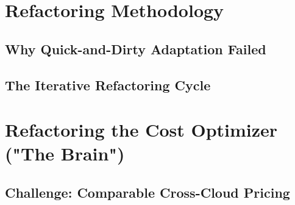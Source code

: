 
\section{Refactoring Methodology}

\subsection{Why Quick-and-Dirty Adaptation Failed}
%

\subsection{The Iterative Refactoring Cycle}
%
%

\section{Refactoring the Cost Optimizer ("The Brain")}

\subsection{Challenge: Comparable Cross-Cloud Pricing}
%
%

